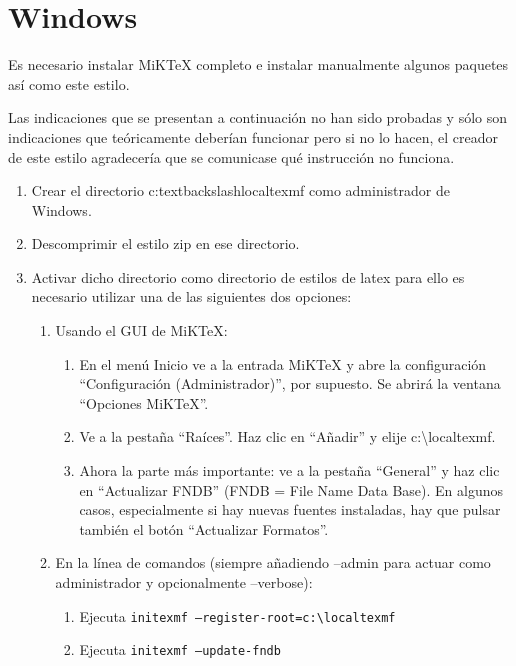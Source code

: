 \section{Windows\textsuperscript{\texttrademark}}

Es necesario instalar MiKTeX completo e instalar manualmente algunos paquetes así como este estilo.

Las indicaciones que se presentan a continuación no han sido probadas y sólo son indicaciones que teóricamente deberían funcionar pero si no lo hacen, el creador de este estilo agradecería que se comunicase qué instrucción no funciona.

\begin{enumerate}
  \item Crear el directorio c:{textbackslash}localtexmf como administrador de Windows.
  \item Descomprimir el estilo zip en ese directorio.
  \item Activar dicho directorio como directorio de estilos de latex para ello es necesario utilizar una de las siguientes dos opciones:
  \begin{enumerate}
    \item Usando el GUI de MiKTeX:
    \begin{enumerate}
      \item En el menú Inicio ve a la entrada MiKTeX y abre la configuración ``Configuración (Administrador)'', por supuesto. Se abrirá la ventana ``Opciones MiKTeX''.
      \item Ve a la pestaña ``Raíces''. Haz clic en ``Añadir'' y elije c:{\textbackslash}localtexmf.
      \item Ahora la parte más importante: ve a la pestaña ``General'' y haz clic en ``Actualizar FNDB'' (FNDB = File Name Data Base). En algunos casos, especialmente si hay nuevas fuentes instaladas, hay que pulsar también el botón ``Actualizar Formatos''.
    \end{enumerate}
    \item En la línea de comandos (siempre añadiendo --admin para actuar como administrador y opcionalmente --verbose):
    \begin{enumerate}
      \item Ejecuta \texttt{initexmf --register-root=c:{\textbackslash}localtexmf}
      \item Ejecuta \texttt{initexmf --update-fndb}
    \end{enumerate}
  \end{enumerate}
\end{enumerate}

